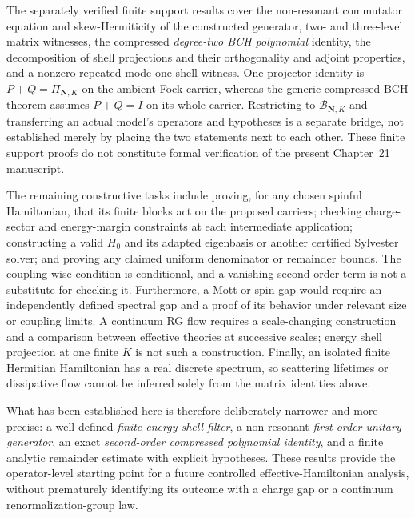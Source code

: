 The separately verified finite support results cover the non-resonant
commutator equation and skew-Hermiticity of the constructed generator,
two- and three-level matrix witnesses, the compressed \emph{degree-two
BCH polynomial} identity, the decomposition of shell projections and
their orthogonality and adjoint properties, and a nonzero repeated-mode-one
shell witness. One projector identity is $P+Q=\Pi_{\boldsymbol N,K}$ on the
ambient Fock carrier, whereas the generic compressed BCH theorem assumes
$P+Q=I$ on its whole carrier. Restricting to
$\mathcal B_{\boldsymbol N,K}$ and transferring an actual model's
operators and hypotheses is a separate bridge, not established merely
by placing the two statements next to each other.  These finite support
proofs do not constitute formal verification of the present Chapter~21
manuscript.

The remaining constructive tasks include proving, for any chosen
spinful Hamiltonian, that its finite blocks act on the proposed
carriers; checking charge-sector and energy-margin constraints at
each intermediate application; constructing a valid $H_0$ and its
adapted eigenbasis or another certified Sylvester solver; and proving
any claimed uniform denominator or remainder bounds.  The
coupling-wise condition is conditional, and a vanishing second-order
term is not a substitute for checking it.  Furthermore, a Mott or
spin gap would require an independently defined spectral gap and a
proof of its behavior under relevant size or coupling limits.
A continuum RG flow requires a scale-changing construction and a
comparison between effective theories at successive scales; energy
shell projection at one finite $K$ is not such a construction.
Finally, an isolated finite Hermitian Hamiltonian has a real discrete
spectrum, so scattering lifetimes or dissipative flow cannot be
inferred solely from the matrix identities above.

What has been established here is therefore deliberately narrower
and more precise: a well-defined \emph{finite energy-shell filter}, a
non-resonant \emph{first-order unitary generator}, an exact
\emph{second-order compressed polynomial identity}, and a finite
analytic remainder estimate with explicit hypotheses.  These results
provide the operator-level starting point for a future controlled
effective-Hamiltonian analysis, without prematurely identifying its
outcome with a charge gap or a continuum renormalization-group law.
